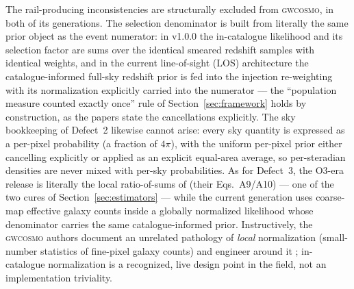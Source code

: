 The rail-producing inconsistencies are structurally excluded from \textsc{gwcosmo}, in both of its generations. The selection denominator is built from literally the same prior object as the event numerator: in v1.0.0 the in-catalogue likelihood and its selection factor are sums over the identical smeared redshift samples with identical weights, and in the current line-of-sight (LOS) architecture the catalogue-informed full-sky redshift prior is fed into the injection re-weighting with its normalization explicitly carried into the numerator --- the ``population measure counted exactly once'' rule of Section~\ref{sec:framework} holds by construction, as the papers state the cancellations explicitly. %
The sky bookkeeping of Defect~2 likewise cannot arise: every sky quantity is expressed as a per-pixel probability (a fraction of $4\pi$), with the uniform per-pixel prior either cancelling explicitly or applied as an explicit equal-area average, so per-steradian densities are never mixed with per-sky probabilities. %
As for Defect~3, the O3-era release is literally the local ratio-of-sums of \citet{Gray:2019ksv} (their Eqs.~A9/A10) --- one of the two cures of Section~\ref{sec:estimators} --- while the current generation uses coarse-map effective galaxy counts inside a globally normalized likelihood whose denominator carries the same catalogue-informed prior. %
Instructively, the \textsc{gwcosmo} authors document an unrelated pathology of \emph{local} normalization (small-number statistics of fine-pixel galaxy counts) and engineer around it \citep{Gray:2023wgj}; in-catalogue normalization is a recognized, live design point in the field, not an implementation triviality. %

